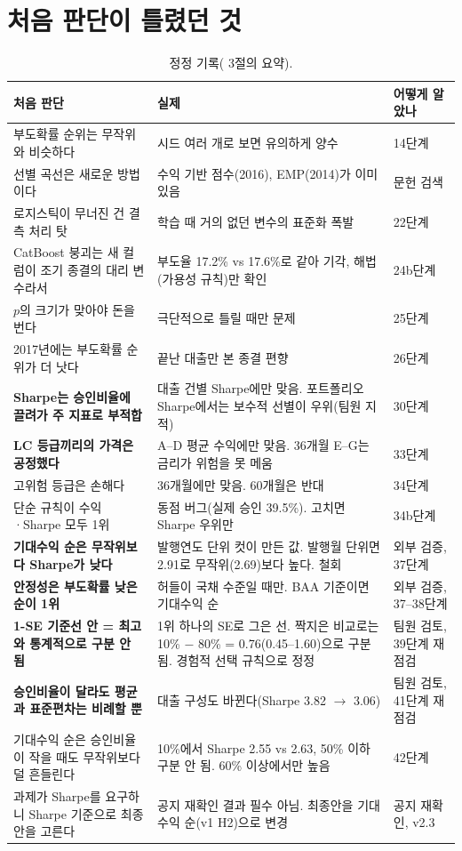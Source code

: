 \section{처음 판단이 틀렸던 것}
\begin{table}[H]\centering\small
\begin{tabularx}{\linewidth}{@{}LLp{22mm}@{}}\toprule
처음 판단 & 실제 & 어떻게 알았나\\\midrule
부도확률 순위는 무작위와 비슷하다 & 시드 여러 개로 보면 유의하게 양수 & 14단계\\
선별 곡선은 새로운 방법이다 & 수익 기반 점수(2016), EMP(2014)가 이미 있음 & 문헌 검색\\
로지스틱이 무너진 건 결측 처리 탓 & 학습 때 거의 없던 변수의 표준화 폭발 & 22단계\\
CatBoost 붕괴는 새 컬럼이 조기 종결의 대리 변수라서 & 부도율 17.2\% vs 17.6\%로 같아 기각, 해법(가용성 규칙)만 확인 & 24b단계\\
$p$의 크기가 맞아야 돈을 번다 & 극단적으로 틀릴 때만 문제 & 25단계\\
2017년에는 부도확률 순위가 더 낫다 & 끝난 대출만 본 종결 편향 & 26단계\\
\textbf{Sharpe는 승인비율에 끌려가 주 지표로 부적합} & 대출 건별 Sharpe에만 맞음. 포트폴리오 Sharpe에서는 보수적 선별이 우위(팀원 지적) & 30단계\\
\textbf{LC 등급끼리의 가격은 공정했다} & A--D 평균 수익에만 맞음. 36개월 E--G는 금리가 위험을 못 메움 & 33단계\\
고위험 등급은 손해다 & 36개월에만 맞음. 60개월은 반대 & 34단계\\
단순 규칙이 수익·\allowbreak{}Sharpe 모두 1위 & 동점 버그(실제 승인 39.5\%). 고치면 Sharpe 우위만 & 34b단계\\
\textbf{기대수익 순은 무작위보다 Sharpe가 낮다} & 발행연도 단위 컷이 만든 값. 발행월 단위면 2.91로 무작위(2.69)보다 높다. 철회 & 외부 검증, 37단계\\
\textbf{안정성은 부도확률 낮은 순이 1위} & 허들이 국채 수준일 때만. BAA 기준이면 기대수익 순 & 외부 검증, 37--38단계\\
\textbf{1-SE 기준선 안 = 최고와 통계적으로 구분 안 됨} & 1위 하나의 SE로 그은 선. 짝지은 비교로는 10\% $-$ 80\% = 0.76(0.45--1.60)으로 구분됨. 경험적 선택 규칙으로 정정 & 팀원 검토, 39단계 재점검\\
\textbf{승인비율이 달라도 평균과 표준편차는 비례할 뿐} & 대출 구성도 바뀐다(Sharpe 3.82 \ensuremath{\to} 3.06) & 팀원 검토, 41단계 재점검\\
기대수익 순은 승인비율이 작을 때도 무작위보다 덜 흔들린다 & 10\%에서 Sharpe 2.55 vs 2.63, 50\% 이하 구분 안 됨. 60\% 이상에서만 높음 & 42단계\\
과제가 Sharpe를 요구하니 Sharpe 기준으로 최종안을 고른다 & 공지 재확인 결과 필수 아님. 최종안을 기대수익 순(v1 H2)으로 변경 & 공지 재확인, v2.3\\\bottomrule
\end{tabularx}
\caption{정정 기록( 3절의 요약).}
\end{table}

